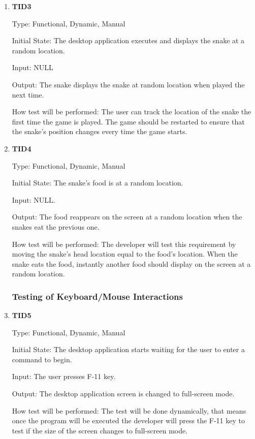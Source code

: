 \documentclass[12pt, titlepage]{article}
\begin{document}
\begin{enumerate}
\item{\textbf{TID3}\\}

Type: Functional, Dynamic, Manual 	
					
Initial State: The desktop application executes and displays the snake at a random location.	
				
Input: NULL

Output: The snake displays the snake at random location when played the next time.
					
How test will be performed: The user can track the location of the snake the first time the game is played. The game should be restarted to ensure that the snake's position changes every time the game starts.

\item{\textbf{TID4}\\}

Type: Functional, Dynamic, Manual 	
					
Initial State: The snake's food is at a random location.
				
Input: NULL.

Output: The food reappears on the screen at a random location when the snakes eat the previous one.
        		
How test will be performed: The developer will test this requirement by moving the snake's head location equal to the food's location. When the snake eats the food, instantly another food should display on the screen at a random location. 

\subsubsection{Testing of Keyboard/Mouse Interactions}
\item{\textbf{TID5}\\}

Type: Functional, Dynamic, Manual 	
					
Initial State: The desktop application starts waiting for the user to enter a command to begin.
					
Input: The user presses F-11 key.
					
Output: The desktop application screen is changed to full-screen mode.
					
How test will be performed: The test will be done dynamically, that means once the program will be executed the developer will press the F-11 key to test if the size of the screen changes to full-screen mode.


\end{enumerate}
\end{document}
